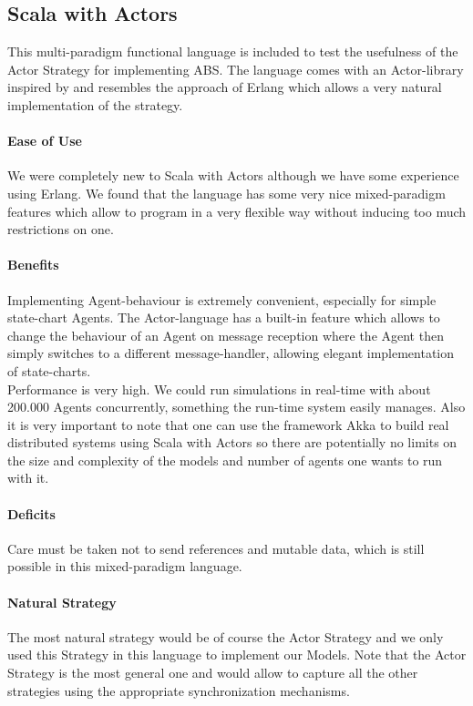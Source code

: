 \subsection{Scala with Actors}
This multi-paradigm functional language is included to test the usefulness of the Actor Strategy for implementing ABS. The language comes with an Actor-library inspired by \cite{agha_actors:_1986} and resembles the approach of Erlang which allows a very natural implementation of the strategy.

\paragraph{Ease of Use}
We were completely new to Scala with Actors although we have some experience using Erlang. We found that the language has some very nice mixed-paradigm features which allow to program in a very flexible way without inducing too much restrictions on one.

\paragraph{Benefits}
Implementing Agent-behaviour is extremely convenient, especially for simple state-chart Agents. The Actor-language has a built-in feature which allows to change the behaviour of an Agent on message reception where the Agent then simply switches to a different message-handler, allowing elegant implementation of state-charts. \\

Performance is very high. We could run simulations in real-time with about 200.000 Agents concurrently, something the run-time system easily manages. Also it is very important to note that one can use the framework Akka to build real distributed systems using Scala with Actors so there are potentially no limits on the size and complexity of the models and number of agents one wants to run with it.

\paragraph{Deficits}
Care must be taken not to send references and mutable data, which is still possible in this mixed-paradigm language.

\paragraph{Natural Strategy}
The most natural strategy would be of course the Actor Strategy and we only used this Strategy in this language to implement our Models. Note that the Actor Strategy is the most general one and would allow to capture all the other strategies using the appropriate synchronization mechanisms.